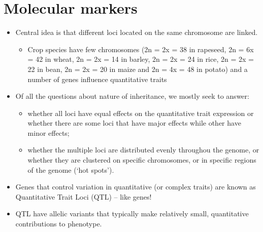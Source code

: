 \documentclass[11pt,dvipsnames,ignorenonframetext,aspectratio=169]{beamer}
\providecommand{\tightlist}{%
  \setlength{\itemsep}{0pt}\setlength{\parskip}{0pt}}
\begin{document}
\hypertarget{molecular-markers}{%
\section{Molecular markers}\label{molecular-markers}}

\begin{frame}{}
\protect\hypertarget{section-2}{}
\begin{itemize}
\tightlist
\item
  Central idea is that different loci located on the same chromosome are
  \alert{linked}.

  \begin{itemize}
  \tightlist
  \item
    Crop species have few chromosomes (2n = 2x = 38 in rapeseed, 2n = 6x
    = 42 in wheat, 2n = 2x = 14 in barley, 2n = 2x = 24 in rice, 2n = 2x
    = 22 in bean, 2n = 2x = 20 in maize and 2n = 4x = 48 in potato) and
    a number of genes influence quantitative traits
  \end{itemize}
\item
  Of all the questions about nature of inheritance, we mostly seek to
  answer:

  \begin{itemize}
  \tightlist
  \item
    whether all loci have equal effects on the quantitative trait
    expression or whether there are some loci that have major effects
    while other have minor effects;
  \item
    whether the multiple loci are distributed evenly throughou the
    genome, or whether they are clustered on specific chromosomes, or in
    specific regions of the genome (`hot spots').
  \end{itemize}
\item
  Genes that control variation in quantitative (or complex traits) are
  known as Quantitative Trait Loci (QTL) -- like genes!
\item
  QTL have allelic variants that typically make relatively small,
  quantitative contributions to phenotype.
\end{itemize}
\end{frame}
\end{document}
